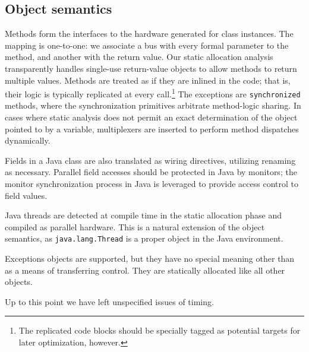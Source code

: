 \documentclass[11pt,notitlepage,twocolumn]{article}
\begin{document}
\subsection{Object semantics}
Methods form the interfaces to the hardware generated for class
instances.  The mapping is one-to-one: we associate a bus with
every formal parameter to the method, and another with the return
value.  Our static allocation analysis transparently handles
single-use return-value objects to allow methods to return multiple
values.  Methods are treated as if they are inlined in the code; that
is, their logic is typically replicated at every call.\footnote{The
replicated code blocks should be specially tagged as potential targets
for later optimization, however.}  The exceptions are
\texttt{synchronized} methods, where the synchronization primitives
arbitrate method-logic sharing.  In cases where static analysis does
not permit an exact determination of the object pointed to by
a variable, multiplexers are inserted to perform method dispatches
dynamically. 

Fields in a Java class are also translated as wiring directives,
utilizing renaming as necessary.  Parallel field accesses should be
protected in Java by monitors; the monitor synchronization process in
Java is leveraged to provide access control to field values.

Java threads are detected at compile time in the static allocation
phase and compiled as parallel hardware.  This is a natural extension
of the object semantics, as \texttt{java.lang.Thread} is a proper 
object in the Java environment.

Exceptions objects are supported, but they have no special meaning other than
as a means of transferring control.  They are statically allocated
like all other objects.

Up to this point we have left unspecified issues of timing.
\end{document}
